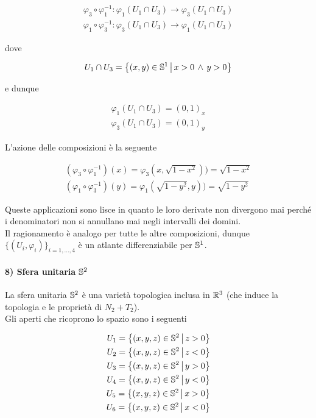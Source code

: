 \begin{gather}
	\varphi_{3} \circ \varphi_{1}^{-1} : \varphi_{1}(U_{1} \cap U_{3}) \to \varphi_{3}(U_{1} \cap U_{3}) \\
	\varphi_{1} \circ \varphi_{3}^{-1} : \varphi_{3}(U_{1} \cap U_{3}) \to \varphi_{1}(U_{1} \cap U_{3})
\end{gather}

dove

\begin{equation}
	U_{1} \cap U_{3} = \left\{ (x,y) \in \S^{1} \st x>0 \, \wedge \, y>0  \right\}
\end{equation}

e dunque

\begin{gather}
	\varphi_{1}(U_{1} \cap U_{3}) = (0,1)_{x} \\
	\varphi_{3}(U_{1} \cap U_{3}) = (0,1)_{y}
\end{gather}

L'azione delle composizioni è la seguente

\begin{gather}
	(\varphi_{3} \circ \varphi_{1}^{-1}) (x) = \varphi_{3} (x,\sqrt{1-x^{2}})) = \sqrt{1-x^{2}} \\
	(\varphi_{1} \circ \varphi_{3}^{-1}) (y) = \varphi_{1} (\sqrt{1-y^{2}},y)) = \sqrt{1-y^{2}}
\end{gather}

Queste applicazioni sono lisce in quanto le loro derivate non divergono mai perché i denominatori non si annullano mai negli intervalli dei domini. \\
Il ragionamento è analogo per tutte le altre composizioni, dunque $ \{(U_{i},\varphi_{i})\}_{i=1,\dots,4} $ è un atlante differenziabile per $ \S^{1} $.

\paragraph{8) Sfera unitaria $ \S^{2} $}\label{example:diff-man-unit-sph}

La sfera unitaria $ \S^{2} $ è una varietà topologica inclusa in $ \R^{3} $ (che induce la topologia e le proprietà di $ N_{2}+T_{2} $). \\
Gli aperti che ricoprono lo spazio sono i seguenti

\begin{align}
	U_{1} = \left\{ (x,y,z) \in \S^{2} \st z>0 \right\} \\
	U_{2} = \left\{ (x,y,z) \in \S^{2} \st z<0 \right\} \\
	U_{3} = \left\{ (x,y,z) \in \S^{2} \st y>0 \right\} \\
	U_{4} = \left\{ (x,y,z) \in \S^{2} \st y<0 \right\} \\
	U_{5} = \left\{ (x,y,z) \in \S^{2} \st x>0 \right\} \\
	U_{6} = \left\{ (x,y,z) \in \S^{2} \st x<0 \right\}
\end{align}

